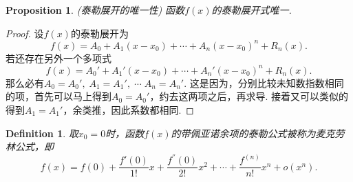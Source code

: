 \documentclass{article}
\newtheorem{proposition}[theorem]{Proposition}
\newtheorem{definition}[theorem]{Definition}
\begin{document}
\begin{proposition}
\rm {\color{red} (泰勒展开的唯一性)} 函数$f(x)$的泰勒展开式唯一.
\end{proposition}

\begin{proof}
设$f(x)$的泰勒展开为
$$
f(x) = A_0 + A_1(x-x_0) + \cdots + A_n(x-x_0)^n + R_n(x).
$$
若还存在另外一个多项式
$$
f(x) = A_0' + A_1'(x-x_0) + \cdots + A_n'(x-x_0)^n + R_n(x).
$$
那么必有$A_0 = A_0',\; A_1 = A_1',\;\cdots \; A_n = A_n'$. 这是因为，分别比较未知数指数相同的项，首先可以马上得到$A_0 = A_0'$，约去这两项之后，再求导. 接着又可以类似的得到$A_1 = A_1'$，余类推，因此系数都相同.
\end{proof}

\begin{definition}
\rm 取$x_0 = 0$时，函数$f(x)$的带佩亚诺余项的泰勒公式被称为{\color{red}麦克劳林}公式，即
$$
f(x) = f(0)+\frac{f'(0)}{1!}x + \frac{f^{''}(0)}{2!}x^2 + \cdots + \frac{f^{(n)}}{n!}x^n + o(x^n).
$$
\end{definition}
\end{document}
